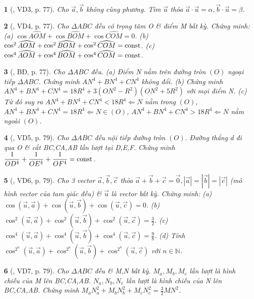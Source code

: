 \documentclass{article}
\newtheorem{baitoan}{}
\begin{document}
\begin{baitoan}[\cite{Hai_Hung_Thu_Tung2022_tap_1}, VD3, p. 77]
	Cho $\vec{a},\vec{b}$ không cùng phương. Tìm $\vec{u}$ thỏa $\vec{a}\cdot\vec{u} = \alpha,\vec{b}\cdot\vec{u} = \beta$.
\end{baitoan}

\begin{baitoan}[\cite{Hai_Hung_Thu_Tung2022_tap_1}, VD4, p. 77]
	Cho $\Delta ABC$ đều có trọng tâm O \& điểm M bất kỳ. Chứng minh: (a) $\cos\widehat{AOM} + \cos\widehat{BOM} + \cos\widehat{COM} = 0$. (b) $\cos^2\widehat{AOM} + \cos^2\widehat{BOM} + \cos^2\widehat{COM} = {\rm const}$. (c) $\cos^4\widehat{AOM} + \cos^4\widehat{BOM} + \cos^4\widehat{COM} = {\rm const}$.
\end{baitoan}

\begin{baitoan}[\cite{Hai_Hung_Thu_Tung2022_tap_1}, BĐ, p. 77]
	Cho $\Delta ABC$ đều. (a) Điểm N nằm trên đường tròn $(O)$ ngoại tiếp $\Delta ABC$. Chứng minh $AN^4 + BN^4 + CN^4$ không đổi. (b) Chứng minh $AN^4 + BN^4 + CN^4 = 18R^4 + 3(ON^2 - R^2)(ON^2 + 5R^2)$ với mọi điểm N. (c) Từ đó suy ra $AN^4 + BN^4 + CN^4 < 18R^4\Leftarrow N$ nằm trong $(O)$, $AN^4 + BN^4 + CN^4 = 18R^4\Leftarrow N\in(O)$, $AN^4 + BN^4 + CN^4 > 18R^4\Leftarrow N$ nằm ngoài $(O)$.
\end{baitoan}

\begin{baitoan}[\cite{Hai_Hung_Thu_Tung2022_tap_1}, VD5, p. 79]
	Cho $\Delta ABC$ đều nội tiếp đường tròn $(O)$. Đường thẳng d đi qua O \& cắt BC,CA,AB lần lượt tại D,E,F. Chứng minh $\dfrac{1}{OD^4} + \dfrac{1}{OE^4} + \dfrac{1}{OF^4} = {\rm const}$.
\end{baitoan}

\begin{baitoan}[\cite{Hai_Hung_Thu_Tung2022_tap_1}, VD6, p. 79]
	Cho 3 vector $\vec{a},\vec{b},\vec{c}$ thỏa $\vec{a} + \vec{b} + \vec{c} = \vec{0},|\vec{a}| = |\vec{b}| = |\vec{c}|$ (mô hình vector của tam giác đều) \& $\vec{u}$ là vector bất kỳ. Chứng minh: (a) $\cos(\vec{u},\vec{a}) + \cos(\vec{u},\vec{b}) + \cos(\vec{u},\vec{c}) = 0$. (b) $\cos^2(\vec{u},\vec{a}) + \cos^2(\vec{u},\vec{b}) + \cos^2(\vec{u},\vec{c}) = \frac{3}{2}$. (c) $\cos^4(\vec{u},\vec{a}) + \cos^4(\vec{u},\vec{b}) + \cos^4(\vec{u},\vec{c}) = \frac{9}{8}$. (d) Tính $\cos^{2^n}(\vec{u},\vec{a}) + \cos^{2^n}(\vec{u},\vec{b}) + \cos^{2^n}(\vec{u},\vec{c})$ với $n\in\mathbb{N}$.
\end{baitoan}

\begin{baitoan}[\cite{Hai_Hung_Thu_Tung2022_tap_1}, VD7, p. 79]
	Cho $\Delta ABC$ đều \& M,N bất kỳ. $M_a,M_b,M_c$ lần lượt là hình chiếu của M lên BC,CA,AB. $N_a,N_b,N_c$ lần lượt là hình chiếu của N lên BC,CA,AB. Chứng minh $M_aN_a^2 + M_bN_b^2 + M_cN_c^2 = \frac{3}{2}MN^2$. 
\end{baitoan}
\end{document}
